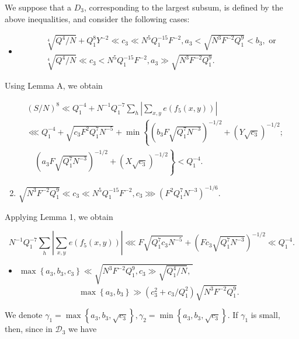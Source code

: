 \documentclass[10pt]{article}
\begin{document}
We suppose that a $D_{3}$, corresponding to the largest subsum, is defined by the above inequalities, and consider the following cases:

\begin{itemize}
  \item[1)] $$
\begin{aligned}
& \sqrt[4]{Q^{4} / N}+Q_{1}^{8} Y^{-2} \ll c_{3} \ll N^{5} Q_{1}^{-15} F^{-2}, a_{3}<\sqrt{N^{3} F^{-2} Q_{1}^{9}}<b_{3}, \text { or } \\
& \sqrt[4]{Q^{4} / N} \ll c_{3}<N^{5} Q_{1}^{-15} F^{-2}, a_{3} \gg \sqrt{N^{3} F^{-2} Q_{1}^{9}} .
\end{aligned}
$$
\end{itemize}

Using Lemma A, we obtain

$$
\begin{aligned}
& (S / N)^{8} \ll Q_{1}^{-4}+N^{-1} Q_{1}^{-7} \sum_{h}\left|\sum_{x, y} e\left(f_{5}(x, y)\right)\right| \\
& \lll Q_{1}^{-4}+\sqrt{c_{3} F^{2} Q_{1}^{7} N^{-5}}+\min \left\{\left(b_{3} F \sqrt{Q_{1}^{7} N^{-3}}\right)^{-1 / 2}+\left(Y \sqrt{c_{3}}\right)^{-1 / 2} ;\right. \\
& \left.\quad\left(a_{3} F \sqrt{Q_{1}^{7} N^{-3}}\right)^{-1 / 2}+\left(X \sqrt{c_{3}}\right)^{-1 / 2}\right\}<Q_{1}^{-4} .
\end{aligned}
$$

\begin{enumerate}
  \setcounter{enumi}{1}
  \item $\sqrt{N^{3} F^{-2} Q_{1}^{9}} \ll c_{3} \ll N^{5} Q_{1}^{-15} F^{-2}, c_{3} \ggg\left(F^{2} Q_{1}^{7} N^{-3}\right)^{-1 / 6}$.
\end{enumerate}

Applying Lemma 1, we obtain

$$
N^{-1} Q_{1}^{-7} \sum_{h}\left|\sum_{x, y} e\left(f_{5}(x, y)\right)\right| \lll F \sqrt{Q_{1}^{7} c_{3} N^{-5}}+\left(F c_{3} \sqrt{Q_{1}^{7} N^{-3}}\right)^{-1 / 2} \ll Q_{1}^{-4} .
$$

\begin{itemize}
  \item[3)] $\max \left\{a_{3}, b_{3}, c_{3}\right\} \ll \sqrt{N^{3} F^{-2} Q_{1}^{9}, c_{3} \gg \sqrt{Q_{1}^{4} / N} \text {, }}$
$$
\max \left\{a_{3}, b_{3}\right\} \gg\left(c_{3}^{2}+c_{3} / Q_{1}^{2}\right) \sqrt{N^{3} F^{-2} Q_{1}^{9}} .
$$
\end{itemize}

We denote $\gamma_{1}=\max \left\{a_{3}, b_{3}, \sqrt{c_{3}}\right\}, \gamma_{2}=\min \left\{a_{3}, b_{3}, \sqrt{c_{3}}\right\}$. If $\gamma_{1}$ is small, then, since in $\mathscr{D}_{3}$ we have
\end{document}
